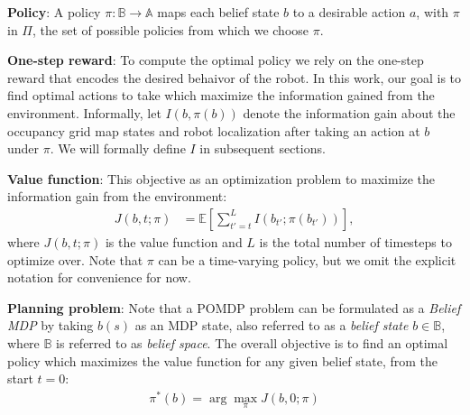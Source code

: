 \documentclass{article}
\newcommand{\ph}[1]{{\textbf{#1}:}} %
\newcommand{\note}[1]{{\color{cyan} NOTE: #1 }}
\begin{document}
\ph{Policy}
A policy $\pi : \mathbb{B} \rightarrow \mathbb{A}$ maps each belief state $b$ to a desirable action $a$, with $\pi$ in $\Pi$, the set of possible policies from which we choose $\pi$.



\ph{One-step reward}
To compute the optimal policy we rely on the one-step reward that encodes the desired behaivor of the robot. In this work, our goal is to find optimal actions to take which maximize the information gained from the environment. Informally, let $I(b, \pi(b))$ denote the information gain about the occupancy grid map states and robot localization after taking an action at $b$ under $\pi$.  We will formally define $I$ in subsequent sections.

\ph{Value function}
This objective as an optimization problem to maximize the information gain from the environment:
\begin{align}
  J(b,t;\pi) &= \mathbb{E} \left[ \sum_{t'=t}^{L} I(b_{t'}; \pi(b_{t'})) \right], \label{eq:artifactopt_cost}
\end{align}
where $J(b,t;\pi)$ is the value function and $L$ is the total number of timesteps to optimize over.  Note that $\pi$ can be a time-varying policy, but we omit the explicit notation for convenience for now.
 
\ph{Planning problem}
Note that a POMDP problem can be formulated as a \textit{Belief MDP} by taking $b(s)$ as an MDP state, also referred to as a \textit{belief state} $b \in \mathbb{B}$, where $\mathbb{B}$ is referred to as \textit{belief space}.  The overall objective is to find an optimal policy which maximizes the value function for any given belief state, from the start $t=0$:
\begin{align}
  \pi^*(b) = \arg\max_\pi J(b,0;\pi)
  \label{eq:MDP-belief}
\end{align}
\end{document}
